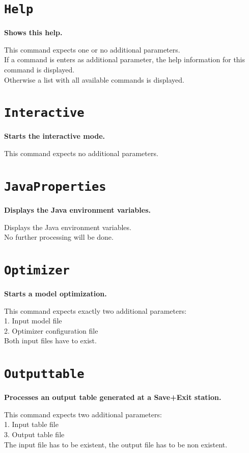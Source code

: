 \section{\texttt{Help}}

\textbf{Shows this help.}

This command expects one or no additional parameters.\\
If a command is enters as additional parameter, the help information for this command is displayed.\\
Otherwise a list with all available commands is displayed.

\section{\texttt{Interactive}}

\textbf{Starts the interactive mode.}

This command expects no additional parameters.

\section{\texttt{JavaProperties}}

\textbf{Displays the Java environment variables.}

Displays the Java environment variables.\\
No further processing will be done.

\section{\texttt{Optimizer}}

\textbf{Starts a model optimization.}

This command expects exactly two additional parameters:\\
1. Input model file\\
2. Optimizer configuration file\\
Both input files have to exist.

\section{\texttt{Outputtable}}

\textbf{Processes an output table generated at a Save+Exit station.}

This command expects two additional parameters:\\
1. Input table file\\
3. Output table file\\
The input file has to be existent, the output file has to be non existent.

